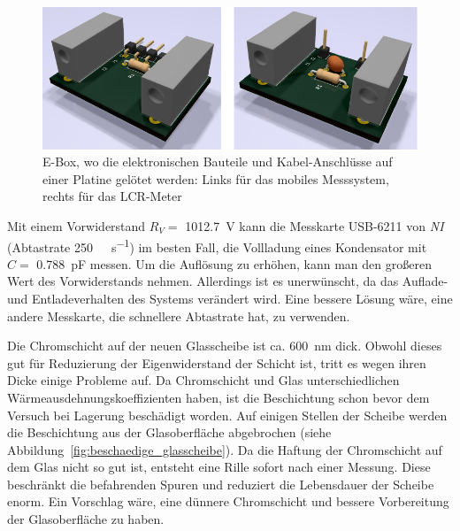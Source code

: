\begin{figure}[htb]
    \centering
    \includegraphics[]{./images/ebox_ladekurve_lcr-meter.pdf}
    \caption{E-Box, wo die elektronischen Bauteile und Kabel-Anschlüsse auf einer Platine gelötet werden: Links für das mobiles Messsystem, rechts für das LCR-Meter}
    \label{fig:ebox_fuer_mobil_und_lcr_meter}
\end{figure}

Mit einem Vorwiderstand $R_V =$ \SI{1012.7}{\V} kann die Messkarte USB-6211 von \textit{NI} (Abtastrate \SI[per-mode=symbol]{250}{\kilo\sample\per\second}) im besten Fall, die Vollladung eines Kondensator mit $C =$ \SI{0.788}{\pico\farad} messen.
Um die Auflösung zu erhöhen, kann man den großeren Wert des Vorwiderstands nehmen.
Allerdings ist es unerwünscht, da das Auflade- und Entladeverhalten des Systems verändert wird.
Eine bessere Lösung wäre, eine andere Messkarte, die schnellere Abtastrate hat, zu verwenden.

Die Chromschicht auf der neuen Glasscheibe ist ca. \SI{600}{\nm} dick.
Obwohl dieses gut für Reduzierung der Eigenwiderstand der Schicht ist, tritt es wegen ihren Dicke einige Probleme auf.
Da Chromschicht und Glas unterschiedlichen Wärmeausdehnungskoeffizienten haben, ist die Beschichtung schon bevor dem Versuch bei Lagerung beschädigt worden.
Auf einigen Stellen der Scheibe werden die Beschichtung aus der Glasoberfläche abgebrochen (siehe Abbildung~\ref{fig:beschaedige_glasscheibe}).
Da die Haftung der Chromschicht auf dem Glas nicht so gut ist, entsteht eine Rille sofort nach einer Messung.
Diese beschränkt die befahrenden Spuren und reduziert die Lebensdauer der Scheibe enorm.
Ein Vorschlag wäre, eine dünnere Chromschicht und bessere Vorbereitung der Glasoberfläche zu haben.

